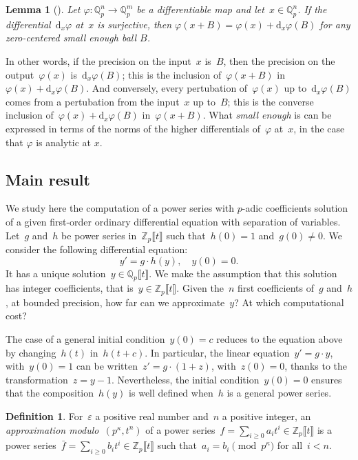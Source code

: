 \documentclass{sig-alternate}
\newtheorem{lem}[theo]{Lemma}
\theoremstyle{definition}
\newtheorem*{defn}{Definition}
\theoremstyle{remark}
\newcommand{\Q}{\mathbb{Q}}
\newcommand{\Qp}{\Q_p}
\newcommand{\ud}{\mathrm{d}}
\newcommand\Zpt{\mathbb{Z}_p \llbracket t \rrbracket}
\newcommand\Qpt{\Qp\llbracket t \rrbracket}
\def\geq{\geqslant}
\begin{document}
\begin{lem}[{\Cite{CarRoeVac14}}] \label{lem:prec}
Let $\varphi : \Qp^n \rightarrow \Qp^m$ be a differentiable
map and let~$x\in\Qp^n$. If the differential~$\ud_x\varphi$ at~$x$
is surjective, then
$ \varphi(x+B)=\varphi(x)+\ud_x \varphi(B)$ for any zero-centered small enough ball $B$.
\end{lem}

In other words, if the precision on the input~$x$ is~$B$, then the precision on
the output~$\varphi(x)$ is~$\ud_x \varphi(B)$; this is the inclusion
of~$\varphi(x+B)$ in~$\varphi(x)+\ud_x \varphi(B)$.  And conversely, every
pertubation of~$\varphi(x)$ up to~$\ud_x \varphi(B)$ comes from a
pertubation from the input~$x$ up to~$B$; this is the converse inclusion
of~$\varphi(x)+\ud_x \varphi(B)$ in~$\varphi(x+B)$. 
What \emph{small enough} is can be
expressed in terms of the norms of the higher differentials of~$\varphi$
at~$x$, in the case that $\varphi$ is analytic at $x$.




\subsection{Main result}

We study here the computation of a power series with $p$-adic coefficients
solution of a given first-order ordinary differential equation with separation of
variables.  Let~$g$ and~$h$ be power series in~$\Zpt$ such
that~$h(0)=1$ and~$g(0)\neq0$. We consider the following differential equation:
\begin{equation} \label{MainDiffEqu} \tag{E}
y' =g \cdot h(y), \quad y(0) = 0.
\end{equation}
It has a unique solution~$y\in \Qpt$. We make the assumption that this solution
has integer coefficients, that is~$y\in \Zpt$.
Given the~$n$ first coefficients of~$g$ and~$h$, at bounded precision,
how far can we approximate~$y$? At which computational cost?

The case of a general initial condition~$y(0)=c$ reduces to the equation above
by changing~$h(t)$ in~$h(t+c)$.  In particular, the linear equation~$y' =
g\cdot y$, with~$y(0)=1$ can be written~$z' = g\cdot(1+z)$, with~$z(0)=0$,
thanks to the transformation~$z = y-1$.  Nevertheless, the initial condition~$y(0)=0$
ensures that the composition~$h(y)$ is well defined when~$h$ is a general power
series.


\begin{defn}
For~$\varepsilon$ a positive real number and~$n$ a positive integer, an
\emph{approximation modulo~$(p^\kappa, t^n)$} of a power series~$f = \sum_{i\geq0} a_i t^i \in \Zpt$
is a power series~$\bar f= \sum_{i\geq0} b_i t^i\in \Zpt$ such that~$a_i = b_i \pmod{p^\kappa}$
for all~$i < n$.
\end{defn}
\end{document}
